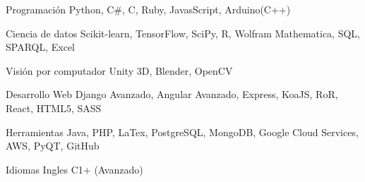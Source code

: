 

\begin{cvskills}

  \cvskill
    {Programación} %
    {Python, C\#, C, Ruby, JavasScript, Arduino(C++)} %

  \cvskill
    {Ciencia de datos}
    {Scikit-learn, TensorFlow, SciPy, R, Wolfram Mathematica, SQL, SPARQL, Excel}

  \cvskill
    {Visión por computador} %
    {Unity 3D, Blender, OpenCV} %

  \cvskill
    {Desarrollo Web} %
    {Django Avanzado, Angular Avanzado, Express, KoaJS, RoR, React, HTML5, SASS} %

  \cvskill
    {Herramientas}
    {Java, PHP, LaTex, PostgreSQL, MongoDB, Google Cloud Services, AWS, PyQT, GitHub}

  \cvskill
    {Idiomas} %
    {Ingles C1+ (Avanzado)} %

\end{cvskills}
